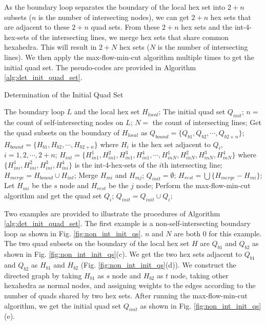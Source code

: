 \documentclass[final,5p,times,twocolumn]{elsarticle}
\begin{document}
As the boundary loop separates the boundary of the local hex set into $2+n$ subsets ($n$ is the number of intersecting nodes), we can get $2+n$ hex sets that are adjacent to these $2+n$ quad sets. From these $2+n$ hex sets and the int-4-hex-sets of the intersecting lines, we merge hex sets that share common hexahedra. This will result in $2+N$ hex sets ($N$ is the number of intersecting lines). We then apply the max-flow-min-cut algorithm multiple times to get the initial quad set. The pseudo-codes are provided in Algorithm \ref{alg:det_init_quad_set}.

\begin{algorithm}
\caption{Determination of the Initial Quad Set}
\label{alg:det_init_quad_set}
\begin{algorithmic}[1]
  \REQUIRE The boundary loop $L$ and the local hex set $H_{local}$;
  \ENSURE The initial quad set $Q_{init}$;
  \STATE $n=$ the count of self-intersecting nodes on $L$;
  \STATE $N=$ the count of intersecting lines;
  \STATE Get the quad subsets on the boundary of $H_{local}$ as $Q_{bound}=\{Q_{b1},Q_{b2},\cdots,Q_{b2+n}\}$;
  \STATE $H_{bound}=\{H_{b1},H_{b2},\cdots,H_{b2+n}\}$ where $H_i$ is the hex set adjacent to $Q_i$,$i=1,2,\cdots,2+n$;
  \STATE $H_{int}=\{H_{in1}^1,H_{in1}^2,H_{in1}^3,H_{in1}^4,\cdots,H_{inN}^1,H_{inN}^2,H_{inN}^3,H_{inN}^4\}$ where $\{H_{ini}^1,H_{ini}^2,H_{ini}^3,H_{ini}^4\}$ is the int-4-hex-sets of the $i$th intersecting line;
  \STATE $H_{merge}=H_{bound} \cup H_{int}$;
     \STATE Merge $H_{mi}$ and $H_{mj}$;
  \ENDWHILE
  \STATE $Q_{init}=\emptyset$;
     \STATE $H_{rest}=\bigcup \{H_{merge} - H_{mi}\}$;
     \STATE Let $H_{mi}$ be the $s$ node and $H_{rest}$ be the $j$ node;
     \STATE Perform the max-flow-min-cut algorithm and get the quad set $Q_i$;
     \STATE $Q_{init}=Q_{init} \cup Q_i$;
  \ENDFOR
\end{algorithmic}
\end{algorithm}

Two examples are provided to illustrate the procedures of Algorithm \ref{alg:det_init_quad_set}. The first example is a non-self-intersecting boundary loop as shown in Fig. \ref{fig:non_int_init_qs}. $n$ and $N$ are both 0 for this example. The two quad subsets on the boundary of the local hex set $H$ are $Q_{b1}$ and $Q_{b2}$ as shown in Fig. \ref{fig:non_int_init_qs}(c). We get the two hex sets adjacent to $Q_{b1}$ and $Q_{b2}$ as $H_{b1}$ and $H_{b2}$ (Fig. \ref{fig:non_int_init_qs}(d)). We construct the directed graph by taking $H_{b1}$ as $s$ node and $H_{b2}$ as $t$ node, taking other hexahedra as normal nodes, and assigning weights to the edges according to the number of quads shared by two hex sets. After running the max-flow-min-cut algorithm, we get the initial quad set $Q_{init}$ as shown in Fig. \ref{fig:non_int_init_qs}(e).
\end{document}
